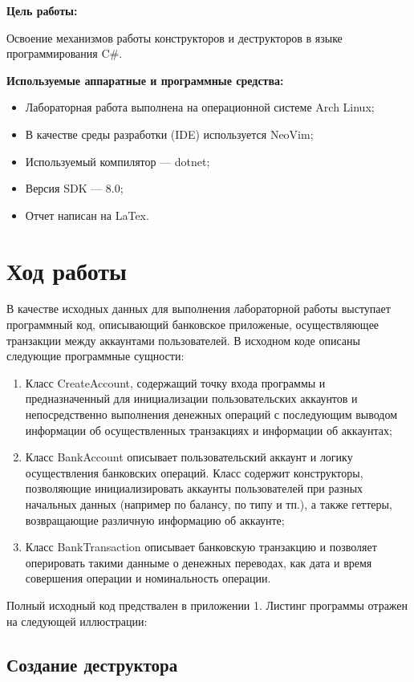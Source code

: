 {\bfseries Цель работы:} 

Освоение механизмов работы конструкторов и деструкторов в языке программирования C\#.

{\bfseries Используемые аппаратные и программные средства:}
\begin{itemize}
    \item Лабораторная работа выполнена на операционной системе Arch Linux;
    \item В качестве среды разработки (IDE) используется NeoVim;
    \item Используемый компилятор --- dotnet;
    \item Версия SDK --- 8.0;
    \item Отчет написан на LaTex.
\end{itemize}


\chapter{Ход работы}
    
В качестве исходных данных для выполнения лабораторной работы выступает программный код, описывающий банковское приложеные, осуществляющее транзакции между аккаунтами пользователей. В исходном коде описаны следующие программные сущности:

\begin{enumerate}
    \item Класс CreateAccount, содержащий точку входа программы и предназначенный для инициализации пользовательских аккаунтов и непосредственно выполнения денежных операций с последующим выводом информации об осуществленных транзакциях и информации об аккаунтах;
    \item Класс BankAccount описывает пользовательский аккаунт и логику осуществления банковских операций. Класс содержит конструкторы, позволяющие инициализировать аккаунты пользователей при разных начальных данных (например по балансу, по типу и тп.), а также геттеры, возвращающие различную информацию об аккаунте;
    \item Класс BankTransaction описывает банковскую транзакцию и позволяет оперировать такими данныме о денежных переводах, как дата и время совершения операции и номинальность операции.
\end{enumerate}

Полный исходный код предствален в приложении 1. 
Листинг программы отражен на следующей иллюстрации:

	\section{Создание деструктора}

